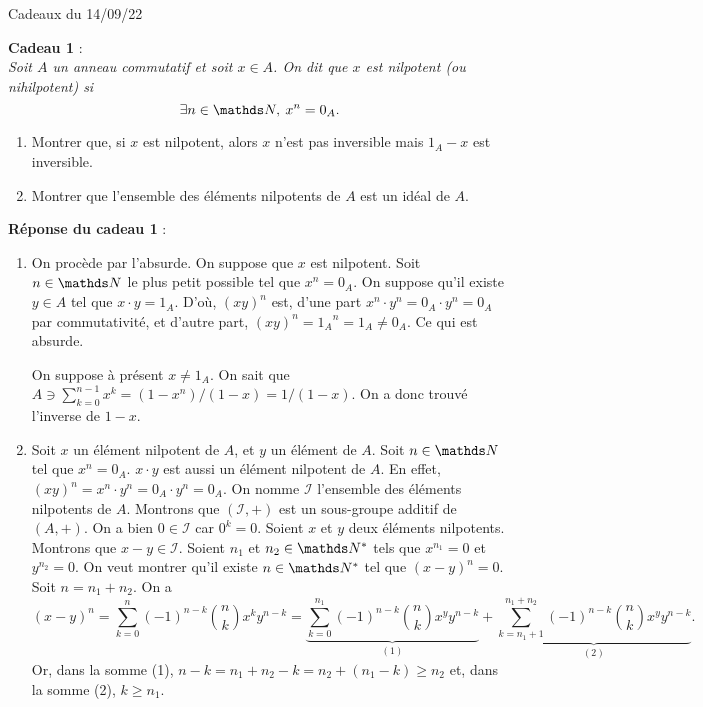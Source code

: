 \documentclass[a4paper]{article}
\begin{document}
	\clearpage
	\centerline{\LARGE Cadeaux du 14/09/22}
	\bigskip
	\bigskip
	{\bf Cadeau 1} :\\
	\slshape
	Soit $A$\/ un anneau commutatif et soit $x \in A$. On dit que $x$\/ est {\it nilpotent}\/ (ou {\it nihilpotent}) si \[
		\exists n \in \N,\:x^n = 0_A
	.\]
	\begin{enumerate}
		\item Montrer que, si $x$\/ est nilpotent, alors $x$\/ n'est pas inversible mais $1_A - x$\/ est inversible.
		\item Montrer que l'ensemble des éléments nilpotents de $A$\/ est un idéal de $A$.
	\end{enumerate}
	\upshape
	\bigskip
	\bigskip

	{\bf Réponse du cadeau 1} :
	\begin{enumerate}
		\item On procède par l'absurde. On suppose que $x$\/ est nilpotent. Soit $n \in \N$\/ le plus petit possible tel que $x^n = 0_A$. On suppose qu'il existe $y \in A$\/ tel que $x\cdot y = 1_A$. D'où, $(xy)^n$\/ est, d'une part $x^n \cdot y^n = 0_A \cdot y^n = 0_A$\/ par commutativité, et d'autre part, $(xy)^n = {1_A}^{n} = 1_A \neq 0_A$. Ce qui est absurde.

			On suppose à présent $x \neq 1_A$. On sait que $A \ni \sum_{k=0}^{n-1} x^k = (1-x^n) / (1-x) = 1 / (1-x)$. On a donc trouvé l'inverse de $1-x$.
		\item Soit $x$\/ un élément nilpotent de $A$, et $y$\/ un élément de $A$. Soit $n \in \N$\/ tel que $x^n = 0_A$. $x\cdot y$\/ est aussi un élément nilpotent de $A$. En effet, $(xy)^n = x^n \cdot y^n = 0_A \cdot y^n = 0_A$. On nomme $\mathcal{I}$\/ l'ensemble des éléments nilpotents de $A$. Montrons que $(\mathcal{I},+)$\/ est un sous-groupe additif de $(A, +)$. On a bien $0 \in \mathcal{I}$\/ car $0^{k} = 0$.
			Soient $x$\/ et $y$\/ deux éléments nilpotents. Montrons que $x -y  \in \mathcal{I}$. Soient $n_1$\/ et $n_2 \in \N^*$\/ tels que $x^{n_1} = 0$\/ et $y^{n_2} = 0$. On veut montrer qu'il existe $n \in \N^*$\/ tel que $(x-y)^n = 0$. Soit $n = n_1 + n_2$. On a \[
				(x-y)^n = \sum_{k=0}^n (-1)^{n-k}{n \choose k} x^k y^{n-k}
				= \underbrace{\sum_{k=0}^{n_1} (-1)^{n-k}{n\choose k} x^y y^{n-k}}_{(1)} + \underbrace{\sum_{k=n_1 + 1}^{n_1 + n_2} (-1)^{n-k}{n\choose k} x^y y^{n-k}}_{(2)}
			.\] Or, dans la somme (1), $n-k = n_1 + n_2 - k = n_2 + (n_1 - k) \ge n_2$\/ et, dans la somme (2), $k \ge n_1$.
	\end{enumerate}

	\bigskip
	\bigskip
	
\end{document}
